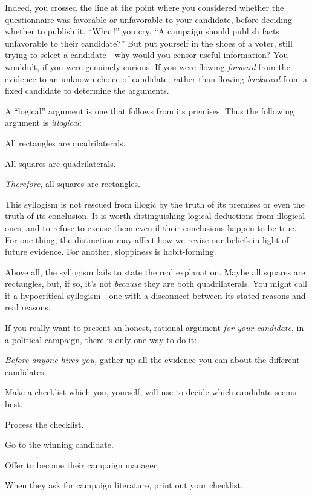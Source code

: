 {
 Indeed, you crossed the line at the point where you considered
whether the questionnaire was favorable or unfavorable to your
candidate, before deciding whether to publish it.
``What!'' you cry.
``A campaign should publish facts unfavorable to their
candidate?'' But put yourself in the shoes of a
voter, still trying to select a candidate---why would you censor useful
information? You wouldn't, if you were genuinely
curious. If you were flowing \textit{forward} from the evidence to an
unknown choice of candidate, rather than flowing \textit{backward} from
a fixed candidate to determine the arguments.}

{
 A ``logical'' argument is one
that follows from its premises. Thus the following argument is
\textit{illogical}:}

{
 All rectangles are quadrilaterals.}

{
 All squares are quadrilaterals.}

{
 \textit{Therefore}, all squares are rectangles.}

{
 This syllogism is not rescued from illogic by the truth of its
premises or even the truth of its conclusion. It is worth
distinguishing logical deductions from illogical ones, and to refuse to
excuse them even if their conclusions happen to be true. For one thing,
the distinction may affect how we revise our beliefs in light of future
evidence. For another, sloppiness is habit-forming.}

{
 Above all, the syllogism fails to state the real explanation.
Maybe all squares are rectangles, but, if so, it's not
\textit{because} they are both quadrilaterals. You might call it a
hypocritical syllogism---one with a disconnect between its stated
reasons and real reasons.}

{
 If you really want to present an honest, rational argument
\textit{for your candidate}, in a political campaign, there is only one
way to do it:}

{
 \textit{Before anyone hires you,} gather up all the evidence you
can about the different candidates.}

{
 Make a checklist which you, yourself, will use to decide which
candidate seems best.}

{
 Process the checklist.}

{
 Go to the winning candidate.}

{
 Offer to become their campaign manager.}

{
 When they ask for campaign literature, print out your checklist.}

